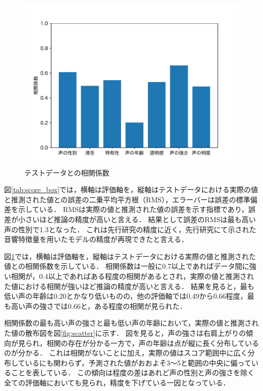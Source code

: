 \begin{figure}[h]
  \centering
  \includegraphics[width=\linewidth]{fig/model_quality_coor.pdf}
  \caption{テストデータとの相関係数}
  \label{tab:score_coor}
\end{figure}

図\ref{tab:score_box}では，横軸は評価軸を，縦軸はテストデータにおける実際の値と推測された値との誤差の二乗平均平方根（RMS），エラーバーは誤差の標準偏差を示している．
RMSは実際の値と推測された値の誤差を示す指標であり，誤差が小さいほど推論の精度が高いと言える．
結果として誤差のRMSは最も高い声の性別で1.3となった．
これは先行研究\cite{dnn}の精度に近く，先行研究にて示された音響特徴量を用いたモデルの精度が再現できたと言える．

図\ref{tab:score_coor}では，横軸は評価軸を，縦軸はテストデータにおける実際の値と推測された値との相関係数を示している．
相関係数は一般に0.7以上であればデータ間に強い相関が，0.4以上であればある程度の相関があるとされ，実際の値と推測された値における相関が強いほど推論の精度が高いと言える．
結果を見ると，最も低い声の年齢は0.20とかなり低いものの，他の評価軸では0.49から0.66程度，最も高い声の強さでは0.66と，ある程度の相関が見られた．

相関係数の最も高い声の強さと最も低い声の年齢において，実際の値と推測された値の散布図を図\ref{fig:scatter}に示す．
図を見ると，声の強さは右肩上がりの傾向が見られ，相関の存在が分かる一方で，声の年齢は点が縦に長く分布しているのが分かる．
これは相関がないことに加え，実際の値はスコア範囲中に広く分布しているにも関わらず，予測された値がおおよそ3〜5と範囲の中央に偏っていることを表している．
この傾向は程度の差はあれど声の性別と声の強さを除く全ての評価軸においても見られ，精度を下げている一因となっている．

